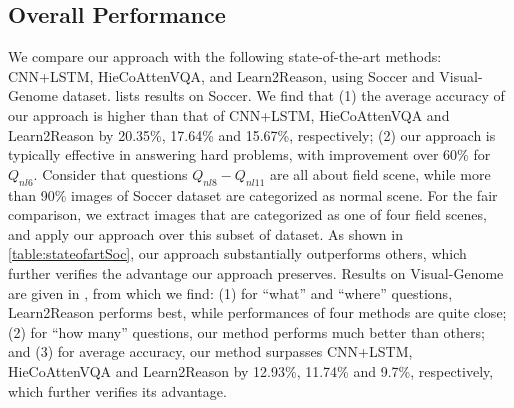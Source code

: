 %
%
%
%

\subsection{Overall Performance}
\label{sec-overall-performance}

We compare our approach with the following state-of-the-art methods: CNN+LSTM, HieCoAttenVQA, and Learn2Reason, using Soccer and Visual-Genome dataset. 
 lists results on Soccer. We find that (1) the average accuracy of our approach is higher than that of CNN+LSTM, HieCoAttenVQA and Learn2Reason by 20.35\%, 17.64\% and 15.67\%,  respectively; (2) our approach is typically effective in answering hard problems, \eg with improvement over 60\% for $Q_{nl6}$. 
Consider that questions $Q_{nl8}-Q_{nl11}$ are all about field scene, while more than 90\% images of Soccer dataset are categorized as normal scene. For the fair comparison, we extract images that are categorized as one of four field scenes, and apply our approach over this subset of dataset. As shown in \cref{table:stateofartSoc}, our approach substantially outperforms others, which further verifies the advantage our approach preserves. 
Results on Visual-Genome are given in , from which we find: (1) for ``what'' and ``where'' questions, Learn2Reason performs best, while performances of four methods are quite close; (2) for ``how many'' questions, our method performs much better than others; and (3) for average accuracy, our method surpasses CNN+LSTM, HieCoAttenVQA and Learn2Reason by 12.93\%, 11.74\% and 9.7\%, respectively, which further verifies its advantage. 

